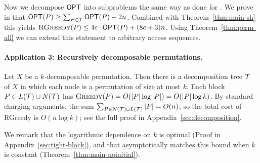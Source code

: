 Now we decompose $\mbox{\sf OPT}$ into subproblems the same way as done for \agreedy. We prove in  that $\mbox{\sf OPT}(P) \geq \sum_{P \in {\mathcal T} } \mbox{\sf OPT}(P) - 2n$. Combined with Theorem~\ref{thm:main-sh} this yields $\textsc{RGreedy}(P) \leq 4c \cdot \mbox{\sf OPT}(P) + (8c + 3)n$.  Using Theorem~\ref{thm:perm-all} we can extend this statement to arbitrary access sequences.



\paragraph{Application 3: Recursively decomposable permutations.} 
Let $X$ be a $k$-decomposable permutation. 
Then there is a decomposition tree ${\mathcal T}$ of $X$ in which each node is a permutation of size at most $k$.
Each block $P \in L({\mathcal T}) \cup N({\mathcal T})$ has $\textsc{Greedy}(P) = O(|P| \log |P|)  = O(|P| \log k)$.
By standard charging arguments, the sum $\sum_{P \in N({\mathcal T}) \cup L({\mathcal T})} |P| = O(n)$, so the total cost of {\sc RGreedy} is $O(n \log k)$; see the full proof in Appendix~\ref{sec:decomposition}.  

We remark that the logarithmic dependence on $k$ is optimal (Proof in Appendix~\ref{sec:tight-block}), and that \greedy asymptotically matches this bound when $k$ is constant (Theorem~\ref{thm:main-noinitial}). 
